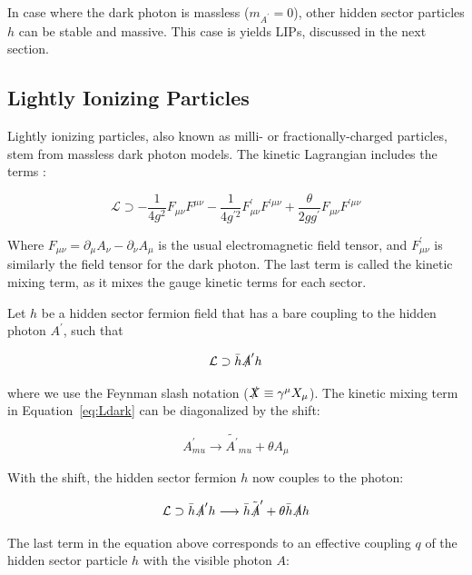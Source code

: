 In case where the dark photon is massless ($m_{A^{\prime}} = 0$), other hidden sector particles $h$ can be stable and massive. This case is yields \ac{LIP}s, discussed in the next section.

\subsection{Lightly Ionizing Particles}
Lightly ionizing particles, also known as milli- or fractionally-charged particles, stem from massless dark photon models. The kinetic Lagrangian includes the terms \cite{Holdom1986} \cite{Abel2008}:

\begin{equation}
\label{eq:Ldark}
\mathcal{L} \supset -\frac{1}{4g^{2}}F_{\mu\nu}F^{\mu\nu} - \frac{1}{4g^{\prime2}}F^{\prime}_{\mu\nu}F^{\prime \mu\nu} + \frac{\theta}{2gg^{\prime}} F_{\mu\nu}F^{\prime \mu\nu}
\end{equation}

Where $F_{\mu\nu} = \partial_{\mu}A_{\nu} - \partial_{\nu}A_{\mu}$ is the usual electromagnetic field tensor, and $F^{\prime}_{\mu\nu}$ is similarly the field tensor for the dark photon. The last term is called the kinetic mixing term, as it mixes the gauge kinetic terms for each sector. 

Let $h$ be a hidden sector fermion field that has a bare coupling to the hidden photon $A^{\prime}$, such that

\begin{equation}
\mathcal{L} \supset \bar{h}\slashed{A}^{\prime} h 
\end{equation}

where we use the Feynman slash notation ($\slashed{X} \equiv \gamma^{\mu}X_{\mu}$). The kinetic mixing term in Equation~\ref{eq:Ldark} can be diagonalized by the shift:

\begin{equation}
A^{\prime}_{mu} \longrightarrow \tilde{A^{\prime}}_{mu} + \theta A_{\mu}
\end{equation}

With the shift, the hidden sector fermion $h$ now couples to the photon:

\begin{equation}
\mathcal{L} \supset \bar{h}\slashed{A}^{\prime} h \longrightarrow  \bar{h}\tilde{\slashed{A}}^{\prime} + \theta \bar{h} \slashed{A} h
\end{equation}

The last term in the equation above corresponds to an effective coupling $q$ of the hidden sector particle $h$ with the visible photon $A$: 

